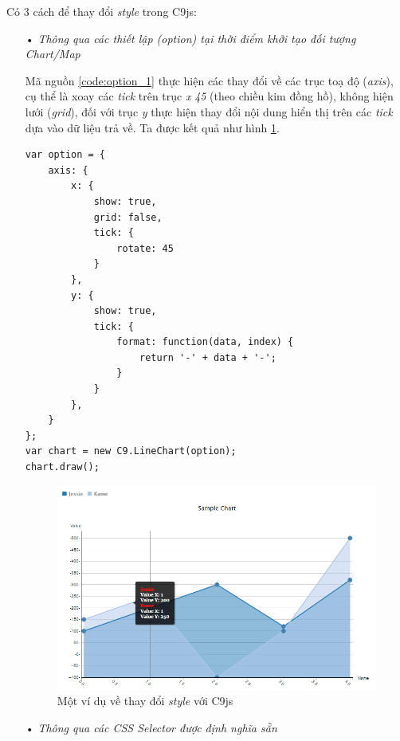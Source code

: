 \documentclass[12pt,a4paper]{article}
\begin{document}
Có 3 cách để thay đổi \textit{style} trong C9js:
\begin{itemize}
\item[•] \emph{Thông qua các thiết lập (option) tại thời điểm khởi tạo đối tượng Chart/Map}

Mã nguồn \ref{code:option_1} thực hiện các thay đổi về các trục toạ độ (\textit{axis}), cụ thể là xoay các \textit{tick} trên trục \textit{x} \textit{45\degree}  (theo chiều kim đồng hồ), không hiện lưới (\textit{grid}), đối với trục \textit{y} thực hiện thay đổi nội dung hiển thị trên các \textit{tick} dựa vào dữ liệu trả về. Ta được kết quả như hình \ref{fig:option_2}.
 
\begin{lstlisting}[caption=Thay đổi \textit{style} tại thời điểm khởi tạo Chart, label={code:option_1}]
var option = {
    axis: {
        x: {
            show: true,
            grid: false,
            tick: {
                rotate: 45
            }
        },
        y: {
            show: true,
            tick: {
                format: function(data, index) {
                    return '-' + data + '-';
                }
            }
        },
    }
};
var chart = new C9.LineChart(option);
chart.draw();
\end{lstlisting}

\begin{figure}[!h]
	\begin{center}
    \includegraphics[scale=.8]{image/option_2}
    \caption{Một ví dụ về thay đổi \textit{style} với C9js}
    \label{fig:option_2}
	\end{center}
\end{figure}

\item[•] \emph{Thông qua các CSS Selector được định nghĩa sẵn}


\end{itemize}
\end{document}
